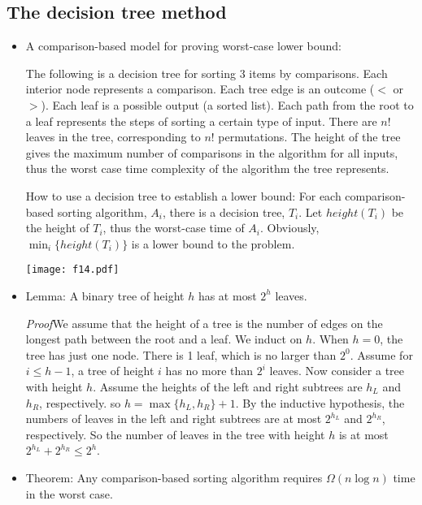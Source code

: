 \documentclass{article}
\begin{document}
\subsection{The decision tree method}


\begin{itemize}

\item A comparison-based model for proving worst-case lower bound:

The following is a decision tree for sorting 3 items by comparisons.
Each interior node represents a comparison. Each tree edge is an
outcome ($<$ or $>$). Each leaf is a possible output (a sorted list).
Each path from the root to a leaf represents the steps of sorting
a certain type of input. There are $n!$ leaves in the tree,
corresponding to $n!$ permutations. The height of the tree gives
the maximum number of comparisons in the algorithm for all inputs,
thus the worst case time complexity of the algorithm the tree 
represents.

How to use a decision tree to establish a lower bound: For each
comparison-based sorting algorithm, $A_i$, there is a decision
tree, $T_i$. Let $height(T_i)$ be the height of $T_i$, thus the
worst-case time of $A_i$. Obviously, $\min_i\{height(T_i)\}$ is
a lower bound to the problem.

\vskip 0.25cm
\begin{center}
\texttt{[image: f14.pdf]}
\end{center}

\item Lemma: A binary tree of height $h$ has at most $2^h$ leaves.

{\em Proof}\quad We assume that the height of a tree is the number of edges
on the longest path between the root and a leaf. We induct on $h$.
When $h=0$, the tree has just one node. There is 1 leaf, which is no larger
than $2^0$. Assume for $i\le h-1$, a tree of height $i$ has no more
than $2^i$ leaves. Now consider a tree with height $h$. Assume the
heights of the left and right subtrees are $h_L$ and $h_R$, respectively.
so $h=\max\{h_L,h_R\}+1$. By the inductive hypothesis, the
numbers of leaves in the left and right subtrees are at most
$2^{h_L}$ and $2^{h_R}$, respectively. So the number of leaves in the
tree with height $h$ is at most $2^{h_L}+2^{h_R}\le 2^h$.

\item Theorem: Any comparison-based sorting algorithm requires
$\Omega(n\log n)$ time in the worst case.


\end{itemize}
\end{document}
